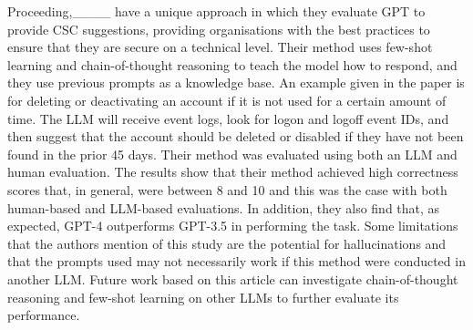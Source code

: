 Proceeding,____ have a unique approach in which they evaluate GPT to provide CSC suggestions, providing organisations with the best practices to ensure that they are secure on a technical level. Their method uses few-shot learning and chain-of-thought reasoning to teach the model how to respond, and they use previous prompts as a knowledge base. An example given in the paper is for deleting or deactivating an account if it is not used for a certain amount of time. The LLM will receive event logs, look for logon and logoff event IDs, and then suggest that the account should be deleted or disabled if they have not been found in the prior 45 days. Their method was evaluated using both an LLM and human evaluation. The results show that their method achieved high correctness scores that, in general, were between 8 and 10 and this was the case with both human-based and LLM-based evaluations. In addition, they also find that, as expected, GPT-4 outperforms GPT-3.5 in performing the task. Some limitations that the authors mention of this study are the potential for hallucinations and that the prompts used may not necessarily work if this method were conducted in another LLM. Future work based on this article can investigate chain-of-thought reasoning and few-shot learning on other LLMs to further evaluate its performance.


